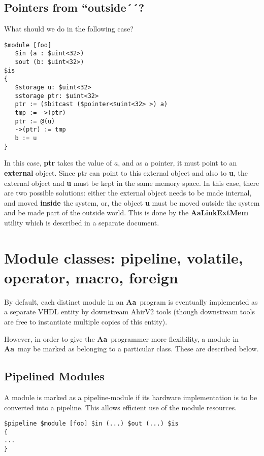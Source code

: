 \documentclass{article}
\newcommand{\Aa}{{\bf Aa}~}
\begin{document}
\subsection{Pointers from ``outside´´? }

What should we do in the following case?
\begin{verbatim}
$module [foo]
   $in (a : $uint<32>)
   $out (b: $uint<32>)
$is
{
   $storage u: $uint<32> 
   $storage ptr: $uint<32>
   ptr := ($bitcast ($pointer<$uint<32> >) a)
   tmp := ->(ptr)
   ptr := @(u)
   ->(ptr) := tmp
   b := u
}
\end{verbatim}
In this case, {\bf ptr} takes the value of $a$,
and as a pointer, it must point to 
an {\bf external} object.  Since ptr can 
point to this external object and also to {\bf u},
the external object and {\bf u} must be kept in
the same memory space.  In this case, there
are two possible solutions: either the external
object needs
to be made internal, and moved {\bf inside} the system,
or, the object {\bf u} must be moved outside the system
and be made part of the outside world.
This is done by the {\bf AaLinkExtMem} utility
which is described in a separate document.


\section{Module classes: pipeline, volatile, operator,  macro, foreign }

By default, each distinct module in an \Aa program
is eventually implemented as a separate VHDL entity
by downstream AhirV2 tools (though downstream
tools are free to instantiate multiple
copies of this entity).  

However, in order to give the \Aa programmer
more flexibility,  a module in \Aa may be marked
as belonging to a particular class.  These
are described below.

\subsection{Pipelined Modules}

A module is marked as a pipeline-module if its
hardware implementation is to be converted into 
a pipeline.  This allows efficient use of the module
resources.

\begin{verbatim}
$pipeline $module [foo] $in (...) $out (...) $is
{
...
}
\end{verbatim}
\end{document}
